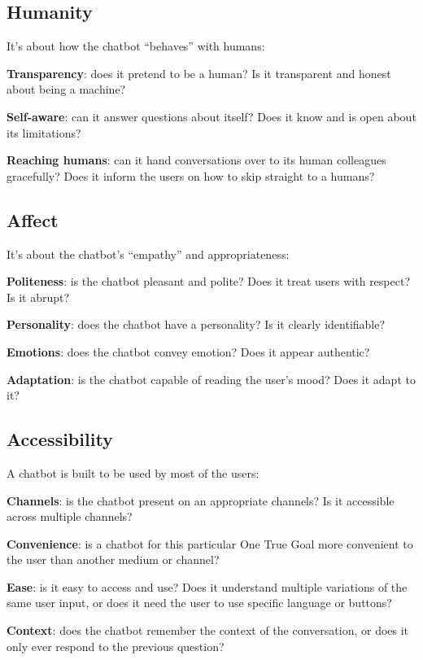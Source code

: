\documentclass{article}
\begin{document}
\subsection{Humanity}
It’s about how the chatbot “behaves” with humans:
\begin{description}
    \item \textbf{Transparency}: does it pretend to be a human? Is it transparent and honest about being a machine?
    \item \textbf{Self-aware}: can it answer questions about itself? Does it know and is open about its limitations?
    \item \textbf{Reaching humans}: can it hand conversations over to its human colleagues gracefully? Does it inform the users on how to skip straight to a humans?
\end{description}

\subsection{Affect}
It’s about the chatbot’s “empathy” and appropriateness:
\begin{description}
    \item \textbf{Politeness}: is the chatbot pleasant and polite? Does it treat users with respect? Is it abrupt?
    \item \textbf{Personality}: does the chatbot have a personality? Is it clearly identifiable?
    \item \textbf{Emotions}: does the chatbot convey emotion? Does it appear authentic?
    \item \textbf{Adaptation}: is the chatbot capable of reading the user's mood? Does it adapt to it?
\end{description}

\subsection{Accessibility}
A chatbot is built to be used by most of the users:
\begin{description}
    \item \textbf{Channels}: is the chatbot present on an appropriate channels? Is it accessible across multiple channels?
    \item \textbf{Convenience}: is a chatbot for this particular One True Goal more convenient to the user than another medium or channel?
    \item \textbf{Ease}: is it easy to access and use? Does it understand multiple variations of the same user input, or does it need the user to use specific language or buttons?
    \item \textbf{Context}: does the chatbot remember the context of the conversation, or does it only ever respond to the previous question?
\end{description}
\end{document}
